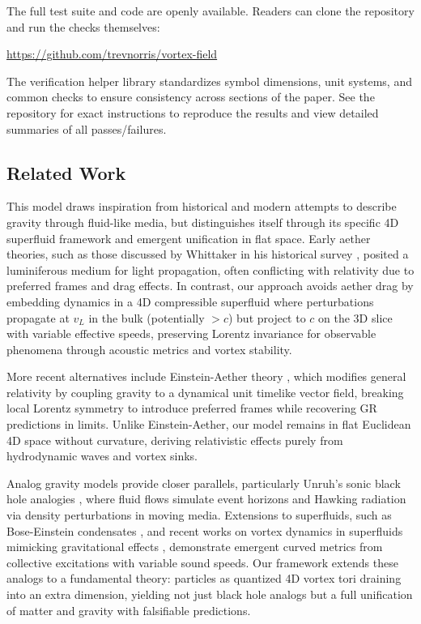 The full test suite and code are openly available. Readers can clone the repository and run the checks themselves:
\begin{center}
\url{https://github.com/trevnorris/vortex-field}
\end{center}

The verification helper library standardizes symbol dimensions, unit systems, and common checks to ensure consistency across sections of the paper. See the repository for exact instructions to reproduce the results and view detailed summaries of all passes/failures.

\subsection{Related Work}

This model draws inspiration from historical and modern attempts to describe gravity through fluid-like media, but distinguishes itself through its specific 4D superfluid framework and emergent unification in flat space. Early aether theories, such as those discussed by Whittaker in his historical survey \cite{whittaker1951history}, posited a luminiferous medium for light propagation, often conflicting with relativity due to preferred frames and drag effects. In contrast, our approach avoids aether drag by embedding dynamics in a 4D compressible superfluid where perturbations propagate at $v_L$ in the bulk (potentially $>c$) but project to $c$ on the 3D slice with variable effective speeds, preserving Lorentz invariance for observable phenomena through acoustic metrics and vortex stability.

More recent alternatives include Einstein-Aether theory \cite{jacobson2004einstein}, which modifies general relativity by coupling gravity to a dynamical unit timelike vector field, breaking local Lorentz symmetry to introduce preferred frames while recovering GR predictions in limits. Unlike Einstein-Aether, our model remains in flat Euclidean 4D space without curvature, deriving relativistic effects purely from hydrodynamic waves and vortex sinks.

Analog gravity models provide closer parallels, particularly Unruh's sonic black hole analogies \cite{unruh1981experimental}, where fluid flows simulate event horizons and Hawking radiation via density perturbations in moving media. Extensions to superfluids, such as Bose-Einstein condensates \cite{steinhauer2016hawking}, and recent works on vortex dynamics in superfluids mimicking gravitational effects \cite{svancara2024rotating}, demonstrate emergent curved metrics from collective excitations with variable sound speeds. Our framework extends these analogs to a fundamental theory: particles as quantized 4D vortex tori draining into an extra dimension, yielding not just black hole analogs but a full unification of matter and gravity with falsifiable predictions.

